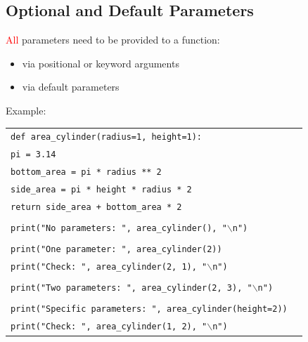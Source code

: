 \documentclass[t,handout,9pt]{beamer}
\begin{document}
\subsection{Optional and Default Parameters}
\begin{frame}
\textcolor{red}{All} parameters need to be provided to a function:
\begin{itemize}
	\item via positional or keyword arguments
	\item via default parameters
\end{itemize}
Example:
\begin{table}[]
\begin{flushleft}
\begin{tabular}{ll}
\texttt{def area\_cylinder(radius=1, height=1):}        & \\
\texttt{\quad pi = 3.14}        & \\
\texttt{\quad bottom\_area = pi * radius ** 2}        & \\
\texttt{\quad side\_area = pi * height * radius * 2}        & \\
\texttt{\quad return side\_area + bottom\_area * 2}        & \\
\texttt{\quad}        & \\
\texttt{print("No parameters: ", area\_cylinder(), "$\backslash$n")}        & \\
\texttt{\quad}        & \\
\texttt{print("One parameter: ", area\_cylinder(2))}        & \\
\texttt{print("Check: ", area\_cylinder(2, 1), "$\backslash$n")}        & \\
\texttt{\quad}        & \\
\texttt{print("Two parameters: ", area\_cylinder(2, 3), "$\backslash$n")}        & \\
\texttt{\quad}        & \\
\texttt{print("Specific parameters: ", area\_cylinder(height=2))}        & \\
\texttt{print("Check: ", area\_cylinder(1, 2), "$\backslash$n")}        & \\
\end{tabular}
\end{flushleft}
\end{table}
\end{frame}
%
\end{document}

